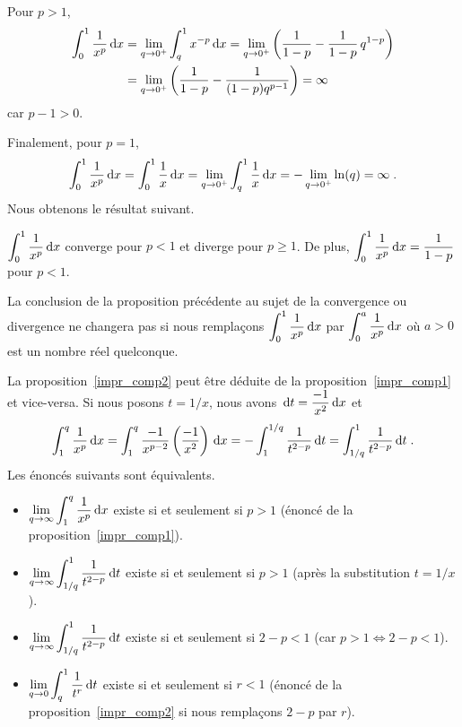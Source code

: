 {Pour $p>1$,
\begin{align*}
\int_0^1 \frac{1}{x^p} \,\mathrm{d}x
&= \lim_{q\rightarrow 0^+} \int_q^1 x^{-p} \,\mathrm{d}x
= \lim_{q\rightarrow 0^+}
\left( \frac{1}{1-p} - \frac{1}{1-p} \, q^{1-p} \right) \\
&= \lim_{q\rightarrow 0^+}
\left( \frac{1}{1-p} - \frac{1}{(1-p)q^{p-1}} \right)
= \infty
\end{align*}
car $p-1>0$.

Finalement, pour $p=1$,
\[
\int_0^1 \frac{1}{x^p} \,\mathrm{d}x = \int_0^1 \frac{1}{x} \,\mathrm{d}x
= \lim_{q\rightarrow 0^+} \int_q^1 \frac{1}{x} \,\mathrm{d}x
= - \lim_{q\rightarrow 0^+} \ln(q) = \infty \; .
\]
Nous obtenons le résultat suivant.

\begin{focus}{\prp}
$\displaystyle \int_0^1 \frac{1}{x^p} \,\mathrm{d}x$ converge pour
$p<1$ et diverge pour $p\geq 1$.  De plus,
$\displaystyle \int_0^1 \frac{1}{x^p} \,\mathrm{d}x = \frac{1}{1-p}$
pour $p<1$.
\label{impr_comp2}
\end{focus}

La conclusion de la proposition précédente au sujet de la convergence
ou divergence ne changera pas si nous remplaçons
$\displaystyle \int_0^1 \frac{1}{x^p} \,\mathrm{d}x$ par
$\displaystyle \int_0^a \frac{1}{x^p} \,\mathrm{d}x$
où $a>0$ est un nombre réel quelconque.

\begin{rmk}[\theory]
La proposition~\ref{impr_comp2} peut être déduite de la
proposition~\ref{impr_comp1} et vice-versa.  Si nous posons $t=1/x$,
nous avons $\displaystyle \,\mathrm{d}t = \frac{-1}{x^2} \,\mathrm{d}x$ et
\[
\int_1^q \frac{1}{x^p} \,\mathrm{d}x
= \int_1^q \frac{-1}{x^{p-2}}\left(\frac{-1}{x^2}\right) \,\mathrm{d}x \\
= -\int_1^{1/q} \frac{1}{t^{2-p}} \,\mathrm{d}t
= \int_{1/q}^1 \frac{1}{t^{2-p}} \,\mathrm{d}t \; .
\]
Les énoncés suivants sont équivalents.

{
\renewcommand{\labelitemi}{$\Leftrightarrow$}
\begin{itemize}
\item[] $\displaystyle \lim_{q\to \infty} \int_1^q \frac{1}{x^p} \,\mathrm{d}x$
existe si et seulement si $p>1$ (énoncé de la proposition~\ref{impr_comp1}).
\item $\displaystyle \lim_{q\to \infty} \int_{1/q}^1 \frac{1}{t^{2-p}} \,\mathrm{d}t$
existe si et seulement si $p>1$ (après la substitution $t = 1/x$).
\item $\displaystyle \lim_{q\to \infty} \int_{1/q}^1 \frac{1}{t^{2-p}} \,\mathrm{d}t$
existe si et seulement si $2-p < 1$ (car $p>1 \Leftrightarrow 2-p <1$).
\item $\displaystyle \lim_{q\to 0} \int_q^1 \frac{1}{t^r} \,\mathrm{d}t$
existe si et seulement si $r<1$ (énoncé de la
proposition~\ref{impr_comp2} si nous remplaçons $2-p$ par $r$).
\end{itemize}
}\end{rmk}

}
